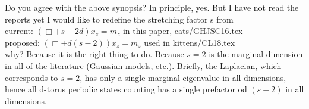 \documentclass[12pt]{iopart} %
\begin{document}
    {Do you agree with the above synopsis?}
    {In principle, yes. But I have not read the reports yet}
    {
 I would like to redefine the stretching factor s from\\
    current:    $(\Box + s - 2d) x_z = m_z$     in this paper, cats/GHJSC16.tex\\
    proposed:   $(\Box + d(s - 2)) x_z = m_z$   used in kittens/CL18.tex\\
    why? Because it is the right thing to do. Because $s=2$ is the
    marginal dimension in all of the literature (Gaussian models, etc.).
    Briefly, the Laplacian, which corresponds to $s=2$, has only a single
    marginal eigenvalue in all dimensions, hence all d-torus periodic
    states counting has a single prefactor od $(s-2)$ in all dimensions.
    }


\printbibliography[
heading=bibintoc,
title={References}
				  ] %
\end{document}
